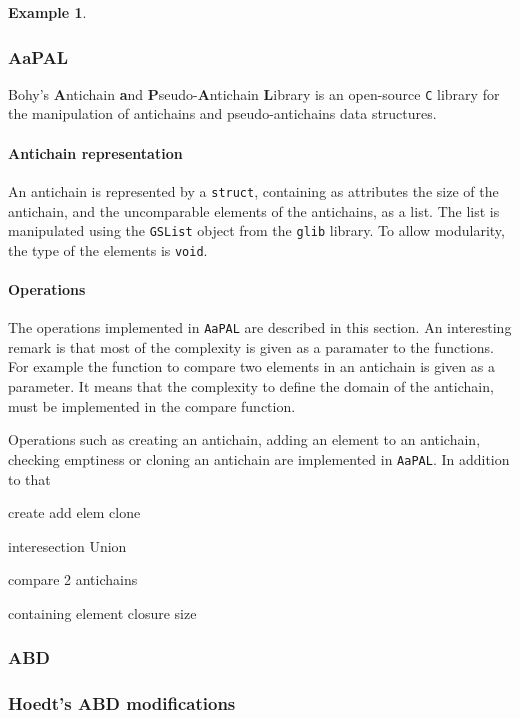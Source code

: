 \documentclass[letterpaper]{article}
\theoremstyle{definition}
\newtheorem{example}{Example}[subsection]
\begin{document}
\begin{example}
\subsubsection{AaPAL}

Bohy's \textbf{A}ntichain
\textbf{a}nd \textbf{P}seudo-\textbf{A}ntichain \textbf{L}ibrary \cite{aapal}
is an open-source \texttt{C} library for the manipulation
of antichains and pseudo-antichains data structures.


\paragraph{Antichain representation}

An antichain is represented by a \texttt{struct}, containing as attributes
the size of the antichain, and the uncomparable elements of the antichains,
as a list. The list is manipulated using the \texttt{GSList} object
from the \texttt{glib} library. To allow modularity, the type of the elements
is \texttt{void}.

\paragraph{Operations}

The operations implemented in \texttt{AaPAL}
are described in this section.
An interesting remark is that most of the complexity is given as a paramater
to the functions. For example the function to compare two elements in
an antichain is given as a parameter. It means that the complexity to define
the domain of the antichain, must be implemented in the compare function.

Operations such as creating an antichain,
adding an element to
an antichain, checking emptiness or cloning an antichain are implemented
in \texttt{AaPAL}. In addition to that

create
add elem
clone

interesection
Union

compare 2 antichains

containing element
closure size



\subsubsection{ABD}

\subsubsection{Hoedt's ABD modifications}




\end{example}
\end{document}
